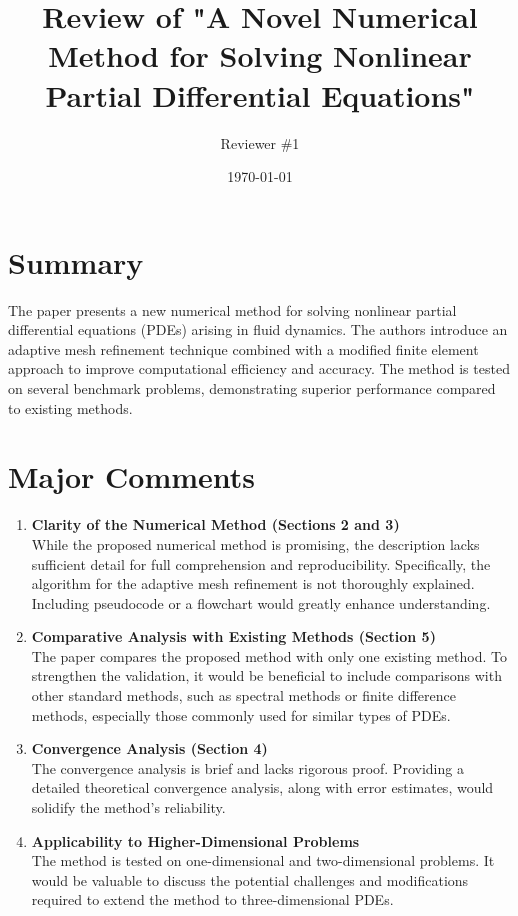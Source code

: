 \documentclass{article}
\begin{document}
\title{Review of "A Novel Numerical Method for Solving Nonlinear Partial Differential Equations"}
\author{Reviewer \#1}
\date{\today}

\maketitle

\section*{Summary}

The paper presents a new numerical method for solving nonlinear partial differential equations (PDEs) arising in fluid dynamics. The authors introduce an adaptive mesh refinement technique combined with a modified finite element approach to improve computational efficiency and accuracy. The method is tested on several benchmark problems, demonstrating superior performance compared to existing methods.

\section*{Major Comments}

\begin{enumerate}
    \item \textbf{Clarity of the Numerical Method (Sections 2 and 3)} \\
    While the proposed numerical method is promising, the description lacks sufficient detail for full comprehension and reproducibility. Specifically, the algorithm for the adaptive mesh refinement is not thoroughly explained. Including pseudocode or a flowchart would greatly enhance understanding.

    \item \textbf{Comparative Analysis with Existing Methods (Section 5)} \\
    The paper compares the proposed method with only one existing method. To strengthen the validation, it would be beneficial to include comparisons with other standard methods, such as spectral methods or finite difference methods, especially those commonly used for similar types of PDEs.

    \item \textbf{Convergence Analysis (Section 4)} \\
    The convergence analysis is brief and lacks rigorous proof. Providing a detailed theoretical convergence analysis, along with error estimates, would solidify the method's reliability.

    \item \textbf{Applicability to Higher-Dimensional Problems} \\
    The method is tested on one-dimensional and two-dimensional problems. It would be valuable to discuss the potential challenges and modifications required to extend the method to three-dimensional PDEs.

\end{enumerate}
\end{document}
